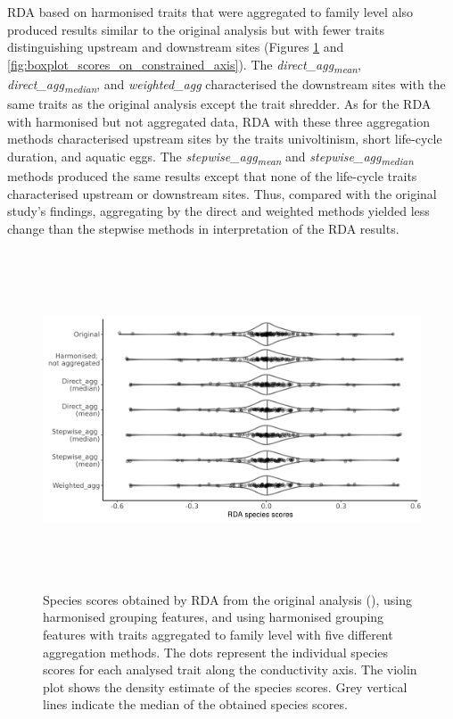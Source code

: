 \documentclass[12pt]{article}
\begin{document}
RDA based on harmonised traits that were aggregated to family level also produced results similar to the original analysis but with fewer traits distinguishing upstream and downstream sites (Figures \ref{fig:violin_plot_species_sc} and \ref{fig:boxplot_scores_on_constrained_axis}). The \textit{direct\_agg\textsubscript{mean}}, \textit{direct\_agg\textsubscript{median}}, and \textit{weighted\_agg} characterised the downstream sites with the same traits as the original analysis except the trait shredder. As for the RDA with harmonised but not aggregated data, RDA with these three aggregation methods characterised upstream sites by the traits univoltinism, short life-cycle duration, and aquatic eggs. The \textit{stepwise\_agg\textsubscript{mean}} and \textit{stepwise\_agg\textsubscript{median}} methods produced the same results except that none of the life-cycle traits characterised upstream or downstream sites. Thus, compared with the original study’s findings, aggregating by the direct and weighted methods yielded less change than the stepwise methods in interpretation of the RDA results.

\begin{figure}[H]
    \centering
    \includegraphics[width=16.5cm, height=10cm]{Species_scores_rda.png}
    \caption{Species scores obtained by RDA from the original analysis (\cite{szocs_effects_2014}), using harmonised grouping features, and using harmonised grouping features with traits aggregated to family level with five different aggregation methods. The dots represent the individual species scores for each analysed trait along the conductivity axis. The violin plot shows the density estimate of the species scores. Grey vertical lines indicate the median of the obtained species scores.}
    \label{fig:violin_plot_species_sc}
\end{figure}
\end{document}
